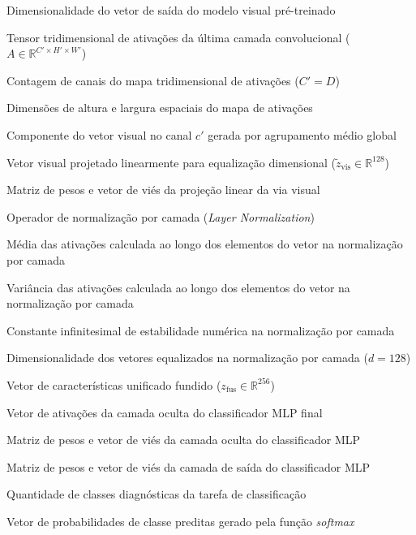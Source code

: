 \documentclass[
  12pt,		
  a4paper,	
  openright,  
  oneside,	
  chapter=TITLE,		
  section=TITLE,		
  english,	
  french,	    
  spanish,	
  brazil	    
]{abntex2}
\begin{document}
\begin{simbolos}
        \item[$D$] Dimensionalidade do vetor de saída do modelo visual pré-treinado
        \item[$A$] Tensor tridimensional de ativações da última camada convolucional ($A \in \mathbb{R}^{C' \times H' \times W'}$)
        \item[$C'$] Contagem de canais do mapa tridimensional de ativações ($C' = D$)
        \item[$H', W'$] Dimensões de altura e largura espaciais do mapa de ativações
        \item[$z_{\mathrm{vis}, c'}$] Componente do vetor visual no canal $c'$ gerada por agrupamento médio global
        \item[$\tilde{z}_{\mathrm{vis}}$] Vetor visual projetado linearmente para equalização dimensional ($\tilde{z}_{\mathrm{vis}} \in \mathbb{R}^{128}$)
        \item[$W_p, b_p$] Matriz de pesos e vetor de viés da projeção linear da via visual
        \item[$\operatorname{LN}(\cdot)$] Operador de normalização por camada (\textit{Layer Normalization})
        \item[$\mu$] Média das ativações calculada ao longo dos elementos do vetor na normalização por camada
        \item[$\sigma^2$] Variância das ativações calculada ao longo dos elementos do vetor na normalização por camada
        \item[$\varepsilon$] Constante infinitesimal de estabilidade numérica na normalização por camada
        \item[$d$] Dimensionalidade dos vetores equalizados na normalização por camada ($d = 128$)
        \item[$z_{\mathrm{fus}}$] Vetor de características unificado fundido ($z_{\mathrm{fus}} \in \mathbb{R}^{256}$)
        \item[$h_{\mathrm{cls}}$] Vetor de ativações da camada oculta do classificador MLP final
        \item[$W_1, b_1$] Matriz de pesos e vetor de viés da camada oculta do classificador MLP
        \item[$W_2, b_2$] Matriz de pesos e vetor de viés da camada de saída do classificador MLP
        \item[$C$] Quantidade de classes diagnósticas da tarefa de classificação
        \item[$\hat{y}$] Vetor de probabilidades de classe preditas gerado pela função \textit{softmax}

\end{simbolos}
\end{document}

